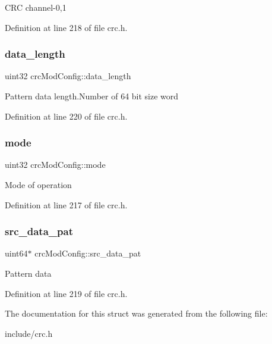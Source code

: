 C\+RC channel-\/0,1 

Definition at line 218 of file crc.\+h.

\mbox{\label{structcrcModConfig_a2893c12aac06a9a7b1d66707df02b6fc}} 
\subsubsection{\texorpdfstring{data\+\_\+length}{data\_length}}
{\footnotesize\ttfamily uint32 crc\+Mod\+Config\+::data\+\_\+length}

Pattern data length.\+Number of 64 bit size word 

Definition at line 220 of file crc.\+h.

\mbox{\label{structcrcModConfig_a58a902f65ab46af3bb418a9331844895}} 
\subsubsection{\texorpdfstring{mode}{mode}}
{\footnotesize\ttfamily uint32 crc\+Mod\+Config\+::mode}

Mode of operation 

Definition at line 217 of file crc.\+h.

\mbox{\label{structcrcModConfig_afb9475d84a6a2522c47d3fbf73deb331}} 
\subsubsection{\texorpdfstring{src\+\_\+data\+\_\+pat}{src\_data\_pat}}
{\footnotesize\ttfamily uint64$\ast$ crc\+Mod\+Config\+::src\+\_\+data\+\_\+pat}

Pattern data 

Definition at line 219 of file crc.\+h.



The documentation for this struct was generated from the following file\+:\begin{DoxyCompactItemize}
\item 
include/crc.\+h\end{DoxyCompactItemize}
